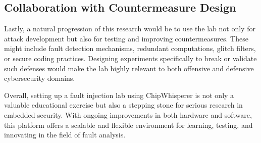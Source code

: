 \subsection*{Collaboration with Countermeasure Design}
Lastly, a natural progression of this research would be to use the lab not only for attack development but also for testing and improving countermeasures. These might include fault detection mechanisms, redundant computations, glitch filters, or secure coding practices. Designing experiments specifically to break or validate such defenses would make the lab highly relevant to both offensive and defensive cybersecurity domains.


Overall, setting up a fault injection lab using ChipWhisperer is not only a valuable educational exercise but also a stepping stone for serious research in embedded security. With ongoing improvements in both hardware and software, this platform offers a scalable and flexible environment for learning, testing, and innovating in the field of fault analysis.





